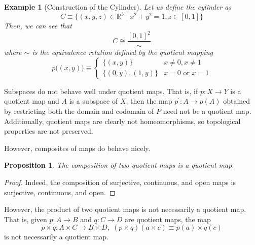 \documentclass{article}
\newtheorem{proposition}[theorem]{Proposition}
\newtheorem{example}{Example}[section]
\theoremstyle{remark}
\theoremstyle{definition}
\begin{document}
\begin{example}[Construction of the Cylinder]
Let us define the cylinder as 
\[C \equiv \{(x, y, z) \in \mathbb{R}^3 \; | \; x^2 + y^2 = 1, z \in [0,1]\} \]
Then, we can see that
\[C \cong \frac{[0,1]^2}{\sim}\]
where $\sim$ is the equivalence relation defined by the quotient mapping 
\[p\big((x, y)\big) \equiv \begin{cases}
      \{(x, y)\} & x \neq 0, x \neq 1 \\
      \{(0,y), (1, y)\} & x = 0 \text{ or } x = 1
\end{cases}\]
\end{example}

Subspaces do not behave well under quotient maps. That is, if $p: X \longrightarrow Y$ is a quotient map and $A$ is a subspace of $X$, then the map $p^\prime: A \longrightarrow p(A)$ obtained by restricting both the domain and codomain of $P$ need not be a quotient map. Additionally, quotient maps are clearly not homeomorphisms, so topological properties are not preserved. 

However, composites of maps do behave nicely. 

\begin{proposition}
The composition of two quotient maps is a quotient map. 
\end{proposition}
\begin{proof}
Indeed, the composition of surjective, continuous, and open maps is surjective, continuous, and open. 
\end{proof}

However, the product of two quotient maps is not necessarily a quotient map. That is, given $p: A \longrightarrow B$ and $q: C \longrightarrow D$ are quotient maps, the map 
\[p \times q: A \times C \longrightarrow B \times D, \; (p \times q) (a \times c) \equiv p(a) \times q(c)\]
is not necessarily a quotient map. 
\end{document}
